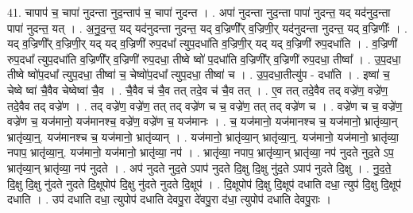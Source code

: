 \documentclass[17pt]{extarticle}
\begin{document}
41. चापाप॑ च॒ चापा॑ नुदन्ता नुद॒न्ताप॑ च॒ चापा॑ नुदन्त । . अपा॑ नुदन्ता नुद॒न्ता पापा॑ नुदन्त॒ यद् यद॑नुद॒न्ता पापा॑ नुदन्त॒ यत् । . अ॒नु॒द॒न्त॒ यद् यद॑नुदन्ता नुदन्त॒ यद् व॒ज्रिणी᳚र् व॒ज्रिणी॒र् यद॑नुदन्ता नुदन्त॒ यद् व॒ज्रिणीः᳚ । . यद् व॒ज्रिणी᳚र् व॒ज्रिणी॒र् यद् यद् व॒ज्रिणी॑ रुप॒दधा᳚ त्युप॒दधा॑ति व॒ज्रिणी॒र् यद् यद् व॒ज्रिणी॑ रुप॒दधा॑ति । . व॒ज्रिणी॑ रुप॒दधा᳚ त्युप॒दधा॑ति व॒ज्रिणी᳚र् व॒ज्रिणी॑ रुप॒दधा॒ तीष्वे ष्वो॑ प॒दधा॑ति व॒ज्रिणी᳚र् व॒ज्रिणी॑ रुप॒दधा॒ तीष्वा᳚ । . उ॒प॒दधा॒ तीष्वे ष्वो॑प॒दधा᳚ त्युप॒दधा॒ तीष्वा॑ च॒ चेष्वो॑प॒दधा᳚ त्युप॒दधा॒ तीष्वा॑ च । . उ॒प॒दधा॒तीत्यु॑प - दधा॑ति । . इष्वा॑ च॒ चेष्वे ष्वा॑ चै॒वैव चेष्वेष्वा॑ चै॒व । . चै॒वैव च॑ चै॒व तत् तदे॒व च॑ चै॒व तत् । . ए॒व तत् तदे॒वैव तद् वज्रे॑ण॒ वज्रे॑ण॒ तदे॒वैव तद् वज्रे॑ण । . तद् वज्रे॑ण॒ वज्रे॑ण॒ तत् तद् वज्रे॑ण च च॒ वज्रे॑ण॒ तत् तद् वज्रे॑ण च । . वज्रे॑ण च च॒ वज्रे॑ण॒ वज्रे॑ण च॒ यज॑मानो॒ यज॑मानश्च॒ वज्रे॑ण॒ वज्रे॑ण च॒ यज॑मानः । . च॒ यज॑मानो॒ यज॑मानश्च च॒ यज॑मानो॒ भ्रातृ॑व्या॒न् भ्रातृ॑व्या॒न्॒. यज॑मानश्च च॒ यज॑मानो॒ भ्रातृ॑व्यान् । . यज॑मानो॒ भ्रातृ॑व्या॒न् भ्रातृ॑व्या॒न्॒. यज॑मानो॒ यज॑मानो॒ भ्रातृ॑व्या॒ नपाप॒ भ्रातृ॑व्या॒न्॒. यज॑मानो॒ यज॑मानो॒ भ्रातृ॑व्या॒ नप॑ । . भ्रातृ॑व्या॒ नपाप॒ भ्रातृ॑व्या॒न् भ्रातृ॑व्या॒ नप॑ नुदते नुद॒ते ऽप॒ भ्रातृ॑व्या॒न् भ्रातृ॑व्या॒ नप॑ नुदते । . अप॑ नुदते नुद॒ते ऽपाप॑ नुदते दि॒क्षु दि॒क्षु नु॑द॒ते ऽपाप॑ नुदते दि॒क्षु । . नु॒द॒ते॒ दि॒क्षु दि॒क्षु नु॑दते नुदते दि॒क्षूपोप॑ दि॒क्षु नु॑दते नुदते दि॒क्षूप॑ । . दि॒क्षूपोप॑ दि॒क्षु दि॒क्षूप॑ दधाति दधा॒ त्युप॑ दि॒क्षु दि॒क्षूप॑ दधाति । . उप॑ दधाति दधा॒ त्युपोप॑ दधाति देवपु॒रा दे॑वपु॒रा द॑धा॒ त्युपोप॑ दधाति देवपु॒राः । \newline
\pagebreak
{}
\end{document}
